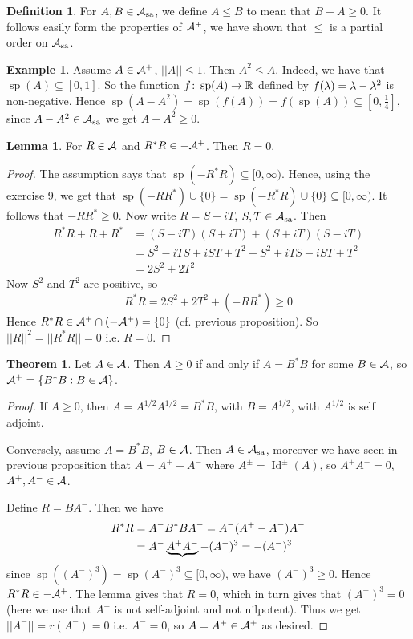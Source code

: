 \documentclass[10pt,english,a4paper]{article}
\theoremstyle{definition}
\newtheorem*{definition}{Definition}
\newtheorem*{theorem}{Theorem}
\newtheorem*{lemma}{Lemma}
\newtheorem*{example}{Example}
\def\Assa{\As_{\text{sa}}}
\DeclareMathOperator{\Id}{Id}
\DeclareMathOperator{\Sp}{sp}
\begin{document}
\begin{definition}
    For $A,B \in \Assa$, we define $A \leq B$ to mean that $B-A \geq 0$. It follows 
    easily form the properties of $\mathcal{A}^+$, we have shown that $\leq$ is a
    partial order on $\Assa$.
\end{definition}
\begin{example}
    Assume $A \in \mathcal{A}^+$, $||A|| \leq 1$. Then $A^2 \leq A$. Indeed, we have that 
    $\Sp(A) \subseteq [0,1]$. So the function $f\colon \Sp(A)\to \R$ 
defined by $f(\lambda) = \lambda - \lambda^2$ is non-negative. Hence 
$\Sp(A-A^2) = \Sp(f(A)) = f(\Sp(A)) \subseteq [0,\tfrac{1}{4}]$, since $A-A^2 \in \Assa$
we get $A-A^2 \geq 0$.
\end{example}

\begin{lemma}
    For $R \in \mathcal{A}$ and $R^*R \in -\mathcal{A}^+$. Then $R =0$.
\end{lemma}
\begin{proof}
    The assumption says that $\Sp(-R^*R) \subseteq [ 0, \infty)$. Hence, using 
    the exercise 9, we get that $\Sp(-RR^*)\cup\{0\} = \Sp(-R^*R)\cup \{0\}
    \subseteq [0,\infty)$. It follows that $-RR^* \geq 0$.
    Now write $R = S + iT$, $S,T \in \Assa$. Then 
    \begin{align*}
    R^*R+R+R^* &= (S-iT)(S+iT) + (S+iT)(S-iT) \\
    &= S^2 -iTS + iST + T^2 + S^2 + iTS -iST + T^2\\
    &= 2S^2 + 2T^2
    \end{align*}    
    Now $S^2$ and $T^2$ are positive, so 
    \[R^* R = 2S^2 + 2T^2 + (-RR^*) \geq 0\]
    Hence $R^*R \in \mathcal{A}^+ \cap (-\mathcal{A}^+) = \{0\}$ (cf. previous proposition).
    So $||R||^2 = ||R^*R|| = 0$ i.e. $R=0$.

\end{proof}

\begin{theorem}
    Let $A \in \mathcal{A}$. Then $A \geq 0$ if and only if $A = B^*B$
for some $B \in \mathcal{A}$, so $\mathcal{A}^+ = \{ B^*B : B \in \mathcal{A} \}$.
\end{theorem}
\begin{proof}
    If $A\geq 0$, then $A = A^{1/2}A^{1/2} = B^*B$, with $B = A^{1/2}$, with 
$A^{1/2}$ is self adjoint. 

Conversely, assume $A = B^*B$, $B \in \mathcal{A}$. Then $A \in \Assa$, moreover we have 
seen in previous proposition that $A = A^+ -A^-$ where $A^{\pm}  = \Id^{\pm}(A)$,
so $A^+A^- = 0$, $A^+,A^- \in \mathcal{A}$.

Define $R = BA^-$. Then we have
\begin{align*}
    R^*R &= A^-B^*BA^- = A^-(A^+-A^-)A^- \\
         &= A^- \underbrace{A^+A^-} - (A^-)^3 = - (A^-)^3
\end{align*}
since $\Sp((A^-)^3) = \Sp(A^-)^3 \subseteq [0,\infty)$, we have
$(A^-)^3 \geq 0$. Hence $R^*R \in -\mathcal{A}^+$.
The lemma gives that $R=0$, which in turn gives that $(A^-)^3 = 0$ 
(here we use that $A^-$ is not self-adjoint and not nilpotent).  
Thus we get $||A^-|| = r(A^-) = 0$ i.e. $A^{-} = 0$, so $A = A^{+} \in \mathcal{A}^+$
as desired. 
\end{proof}
\end{document}
